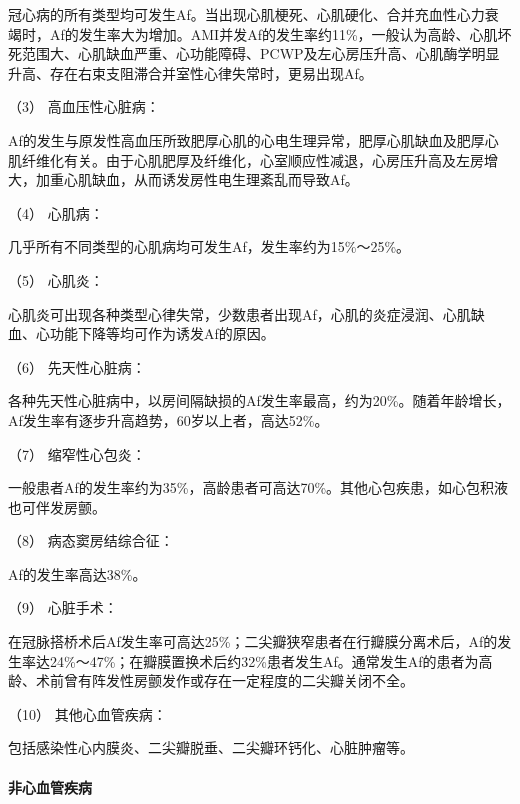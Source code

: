 冠心病的所有类型均可发生Af。当出现心肌梗死、心肌硬化、合并充血性心力衰竭时，Af的发生率大为增加。AMI并发Af的发生率约11\%，一般认为高龄、心肌坏死范围大、心肌缺血严重、心功能障碍、PCWP及左心房压升高、心肌酶学明显升高、存在右束支阻滞合并室性心律失常时，更易出现Af。

\hypertarget{text00291.htmlux5cux23CHP10-2-4-1-1-1-3}{}
（3） 高血压性心脏病：

Af的发生与原发性高血压所致肥厚心肌的心电生理异常，肥厚心肌缺血及肥厚心肌纤维化有关。由于心肌肥厚及纤维化，心室顺应性减退，心房压升高及左房增大，加重心肌缺血，从而诱发房性电生理紊乱而导致Af。

\hypertarget{text00291.htmlux5cux23CHP10-2-4-1-1-1-4}{}
（4） 心肌病：

几乎所有不同类型的心肌病均可发生Af，发生率约为15\%～25\%。

\hypertarget{text00291.htmlux5cux23CHP10-2-4-1-1-1-5}{}
（5） 心肌炎：

心肌炎可出现各种类型心律失常，少数患者出现Af，心肌的炎症浸润、心肌缺血、心功能下降等均可作为诱发Af的原因。

\hypertarget{text00291.htmlux5cux23CHP10-2-4-1-1-1-6}{}
（6） 先天性心脏病：

各种先天性心脏病中，以房间隔缺损的Af发生率最高，约为20\%。随着年龄增长，Af发生率有逐步升高趋势，60岁以上者，高达52\%。

\hypertarget{text00291.htmlux5cux23CHP10-2-4-1-1-1-7}{}
（7） 缩窄性心包炎：

一般患者Af的发生率约为35\%，高龄患者可高达70\%。其他心包疾患，如心包积液也可伴发房颤。

\hypertarget{text00291.htmlux5cux23CHP10-2-4-1-1-1-8}{}
（8） 病态窦房结综合征：

Af的发生率高达38\%。

\hypertarget{text00291.htmlux5cux23CHP10-2-4-1-1-1-9}{}
（9） 心脏手术：

在冠脉搭桥术后Af发生率可高达25\%；二尖瓣狭窄患者在行瓣膜分离术后，Af的发生率达24\%～47\%；在瓣膜置换术后约32\%患者发生Af。通常发生Af的患者为高龄、术前曾有阵发性房颤发作或存在一定程度的二尖瓣关闭不全。

\hypertarget{text00291.htmlux5cux23CHP10-2-4-1-1-1-10}{}
（10） 其他心血管疾病：

包括感染性心内膜炎、二尖瓣脱垂、二尖瓣环钙化、心脏肿瘤等。

\paragraph{非心血管疾病}

